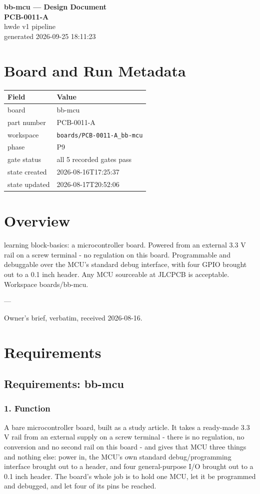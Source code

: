 \documentclass[11pt,a4paper]{article}
\begin{document}
\sloppy
\begin{center}
{\LARGE\bfseries bb-mcu --- Design Document}\\[6pt]
{\Large\bfseries PCB-0011-A}\\[6pt]
{\large hwde v1 pipeline}\\[2pt]
generated 2026-09-25 18:11:23
\end{center}
\tableofcontents

\section{Board and Run Metadata}
{\small
\begin{longtable}{lp{11cm}}
\toprule
\textbf{Field} & \textbf{Value} \\
\midrule
\endhead
board & bb-mcu \\
part number & PCB-0011-A \\
workspace & \texttt{boards/PCB-0011-A\_bb-mcu} \\
phase & P9 \\
gate status & all 5 recorded gates pass \\
state created & 2026-08-16T17:25:37 \\
state updated & 2026-08-17T20:52:06 \\
\bottomrule
\end{longtable}
}
\section{Overview}
learning block-basics: a microcontroller board. Powered from an external 3.3 V rail on a screw terminal - no regulation on this board. Programmable and debuggable over the MCU's standard debug interface, with four GPIO brought out to a 0.1 inch header. Any MCU sourceable at JLCPCB is acceptable. Workspace boards/bb-mcu.

---

Owner's brief, verbatim, received 2026-08-16.

\section{Requirements}
\subsection*{Requirements: bb-mcu}
\subsubsection*{1. Function}
A bare microcontroller board, built as a study article. It takes a ready-made 3.3 V rail from an external supply on a screw terminal - there is no regulation, no conversion and no second rail on this board - and gives that MCU three things and nothing else: power in, the MCU's own standard debug/programming interface brought out to a header, and four general-purpose I/O brought out to a 0.1 inch header. The board's whole job is to hold one MCU, let it be programmed and debugged, and let four of its pins be reached.
\end{document}
